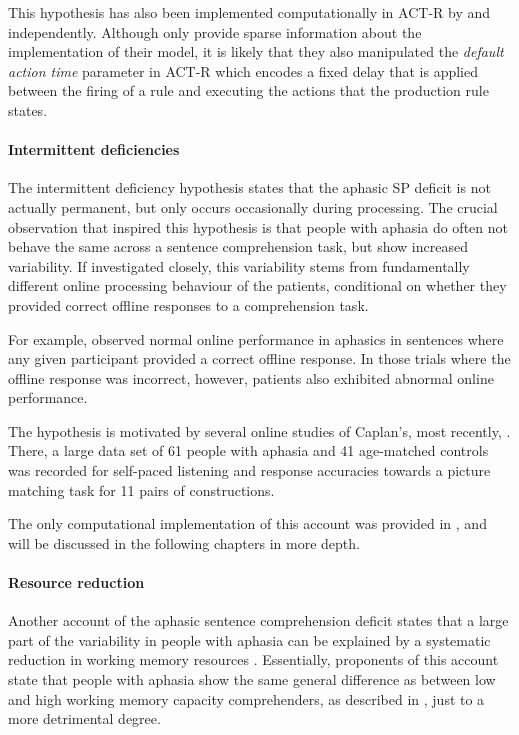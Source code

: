 \documentclass[main_thesis]{subfiles}
\begin{document}
This hypothesis has also been implemented computationally in ACT-R by  and  independently. Although  only provide sparse information about the implementation of their model, it is likely that they also manipulated the \emph{default action time} parameter in ACT-R which encodes a fixed delay that is applied between the firing of a rule and executing the actions that the production rule states.

\paragraph{Intermittent deficiencies}

The intermittent deficiency hypothesis states that the aphasic SP deficit is not actually permanent, but only occurs occasionally during processing. The crucial observation that inspired this hypothesis is that people with aphasia do often not behave the same across a sentence comprehension task, but show increased variability. If investigated closely, this variability stems from fundamentally different online processing behaviour of the patients, conditional on whether they provided correct offline responses to a comprehension task. 

For example, observed normal online performance in aphasics in sentences where any given participant provided a correct offline response. In those trials where the offline response was incorrect, however, patients also exhibited abnormal online performance.

The hypothesis is motivated by several online studies of Caplan's, most recently, . There, a large data set of 61 people with aphasia and 41 age-matched controls was recorded for self-paced listening and response accuracies towards a picture matching task for 11 pairs of constructions.

The only computational implementation of this account was provided in , and will be discussed in the following chapters in more depth.

\paragraph{Resource reduction}

Another account of the aphasic sentence comprehension deficit states that a large part of the variability in people with aphasia can be explained by a systematic reduction in working memory resources \cite{Miyakeetal1994}. Essentially, proponents of this account state that people with aphasia show the same general difference as between low and high working memory capacity comprehenders, as described in , just to a more detrimental degree.
\end{document}
